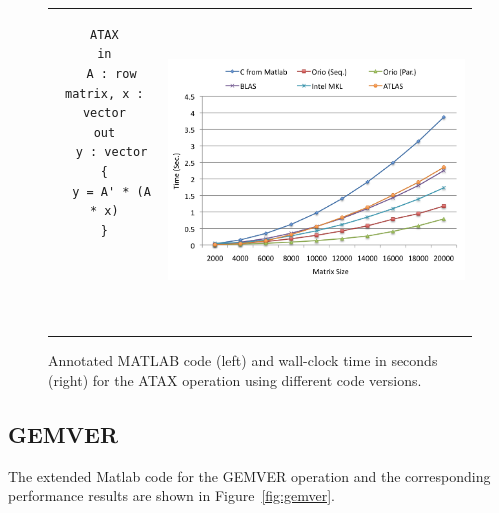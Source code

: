 \documentclass[11pt]{article}
\begin{document}
\begin{figure}[htp]
\centering
\begin{tabular}{cc}
\begin{minipage}[b]{.3\textwidth}
\footnotesize
\begin{verbatim}
ATAX
in
  A : row matrix, x : vector
out
  y : vector
{
  y = A' * (A * x)
}





\end{verbatim}
\end{minipage}
&
\begin{minipage}[b]{.6\textwidth}
\includegraphics[width=\textwidth]{figures/atax.png}
\end{minipage}\\
\end{tabular}
\caption{Annotated MATLAB code (left) and wall-clock time in seconds (right) for the ATAX operation using different code versions.}
\label{fig:atax}
\end{figure}

\subsection{GEMVER}


The extended Matlab code for the GEMVER operation and the corresponding performance results are shown in Figure~\ref{fig:gemver}.
\end{document}
